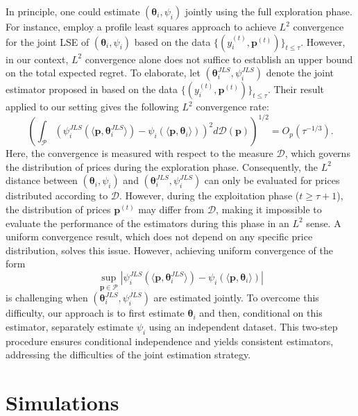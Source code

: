 \documentclass{article} %
\begin{document}
In principle, one could estimate $(\boldsymbol{\theta}_i, \psi_i)$ jointly using the full exploration phase. For instance, \cite{balabdaoui2019least} employ a profile least squares approach to achieve $L^2$ convergence for the joint LSE of $(\boldsymbol{\theta}_i, \psi_i)$ based on the data $\{(y_i^{(t)}, \mathbf{p}^{(t)})\}_{t \leq \tau}$. However, in our context, $L^2$ convergence alone does not suffice to establish an upper bound on the total expected regret. To elaborate, let $(\boldsymbol{\theta}_i^{JLS}, \psi_i^{JLS})$ denote the joint estimator proposed in \cite{balabdaoui2019least} based on the data $\{(y_i^{(t)}, \mathbf{p}^{(t)})\}_{t \leq \tau}$. Their result applied to our setting gives the following $L^2$ convergence rate:
\[
\textstyle  \left(\int_{\mathcal{P}} \left(\psi_i^{JLS}(\langle\mathbf{p},\boldsymbol{\theta}_i^{JLS}\rangle) - \psi_i(\langle\mathbf{p}, \boldsymbol{\theta}_i\rangle)\right)^2 d \mathscr{D}(\mathbf{p})\right)^{1/2} = O_p\left(\tau^{-1/3}\right).
\]
Here, the convergence is measured with respect to the measure $\mathscr{D}$, which governs the distribution of prices during the exploration phase. Consequently, the $L^2$ distance between $(\boldsymbol{\theta}_i, \psi_i)$ and $(\boldsymbol{\theta}_i^{JLS}, \psi_i^{JLS})$ can only be evaluated for prices distributed according to $\mathscr{D}$. However, during the exploitation phase ($t \geq \tau + 1$), the distribution of prices $\mathbf{p}^{(t)}$ may differ from $\mathscr{D}$, making it impossible to evaluate the performance of the estimators during this phase in an $L^2$ sense. A uniform convergence result, which does not depend on any specific price distribution, solves this issue. However, achieving uniform convergence of the form
\begin{equation}\label{eq:sup_conv}
\textstyle  \sup_{\mathbf{p} \in \mathcal{P}} \left|\psi_i^{JLS}(\langle\mathbf{p},\boldsymbol{\theta}_i^{JLS}\rangle) - \psi_i(\langle\mathbf{p}, \boldsymbol{\theta}_i\rangle)\right|
\end{equation}
is challenging when $(\boldsymbol{\theta}_i^{JLS}, \psi_i^{JLS})$ are estimated jointly. To overcome this difficulty, our approach is to first estimate $\boldsymbol{\theta}_i$ and then, conditional on this estimator, separately estimate $\psi_i$ using an independent dataset. This two-step procedure ensures conditional independence and yields consistent estimators, addressing the difficulties of the joint estimation strategy.

\newpage

\section{Simulations}\label{app:additional_experimets}
\end{document}
